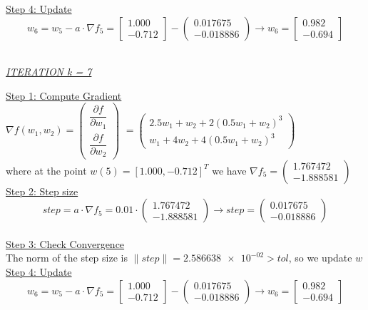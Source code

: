 \underline{Step 4: Update}
\[ 
w_6 = w_5 - a\cdot \nabla f_5 =  \left[\begin{array}{c}
	1.000\\
	-0.712
\end{array}\right] - \left(\begin{array}{c}
	0.017675 \\
	-0.018886
\end{array}\right) \rightarrow
w_6 = \left[\begin{array}{c}
	0.982\\
	-0.694
\end{array}\right]
\]
\\[4mm]

\begin{center}
	\underline{\textit{ITERATION k = 7}}
\end{center}

\underline{Step 1: Compute Gradient}\\
\(\nabla f(w_1,w_2) = \left(\begin{array}{c}
	\dfrac{\partial f}{\partial w_1} \\[4mm]
	\dfrac{\partial f}{\partial w_2}
\end{array}\right)\) $= \left(\begin{array}{c}
	2.5w_1 + w_2 + 2(0.5w_1+w_2)^3\\[1mm]
	w_1 + 4w_2 + 4(0.5w_1+w_2)^3
\end{array}\right)$ \\[3mm]

where at the point $w\left(5\right) = \left[1.000, -0.712\right]^T$ we have $\nabla f_{5} = \left(\begin{array}{c}
	1.767472 \\
	-1.888581
\end{array}\right)$
\\[4mm]

\underline{Step 2: Step size}
\[
step = a \cdot \nabla f_{5} = 0.01 \cdot \left(\begin{array}{c}
	1.767472 \\
	-1.888581
\end{array}\right) \rightarrow step =\left(\begin{array}{c}
	0.017675 \\
	-0.018886
\end{array}\right)
\]
\\[4mm]

\underline{Step 3: Check Convergence}\\
The norm of the step size is $\| step \| = \num{2.586638e-02} > tol$, so we update $w$
\\[4mm]

\underline{Step 4: Update}
\[ 
w_6 = w_5 - a\cdot \nabla f_5 =  \left[\begin{array}{c}
	1.000\\
	-0.712
\end{array}\right] - \left(\begin{array}{c}
	0.017675 \\
	-0.018886
\end{array}\right) \rightarrow
w_6 = \left[\begin{array}{c}
	0.982\\
	-0.694
\end{array}\right]
\]
\\[4mm]







